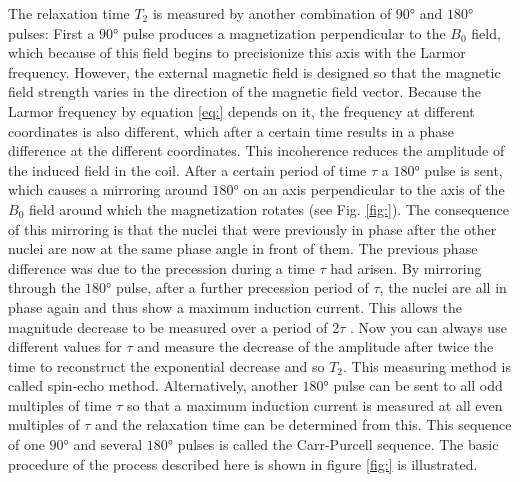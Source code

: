 The relaxation time $T_2$ is measured by another combination of $\ang{90}$ and $\ang{180}$ pulses:
First a $\ang{90}$ pulse produces a magnetization perpendicular to the $B_0$ field, which because of this field begins to precisionize this axis with the Larmor frequency.
However, the external magnetic field is designed so that the magnetic field strength varies in the direction of the magnetic field vector.
Because the Larmor frequency by equation \ref{eq:} depends on it, the frequency at different coordinates is also different, which after a certain time results in a phase difference at the different coordinates.
This incoherence reduces the amplitude of the induced field in the coil.
After a certain period of time $\tau$ a $\ang{180}$ pulse is sent, which causes a mirroring around $\ang{180}$ on an axis perpendicular to the axis of the $B_0$ field around which the magnetization rotates (see Fig. \ref{fig:}).
The consequence of this mirroring is that the nuclei that were previously in phase after the other nuclei are now at the same phase angle in front of them. 
The previous phase difference was due to the precession during a time $\tau$ had arisen.
By mirroring through the $\ang{180}$ pulse, after a further precession period of $\tau$, the nuclei are all in phase again and thus show a maximum induction current.
This allows the magnitude decrease to be measured over a period of 2$\tau$ .
Now you can always use different values for $\tau$ and measure the decrease of the amplitude after twice the time to reconstruct the exponential decrease and so $T_2$.
This measuring method is called spin-echo method.
Alternatively, another $\ang{180}$ pulse can be sent to all odd multiples of time $\tau$ so that a maximum induction current is measured at all even multiples of $\tau$ and the relaxation time can be determined from this.
This sequence of one $\ang{90}$ and several $\ang{180}$ pulses is called the Carr-Purcell sequence.
The basic procedure of the process described here is shown in figure \ref{fig:} is illustrated.



